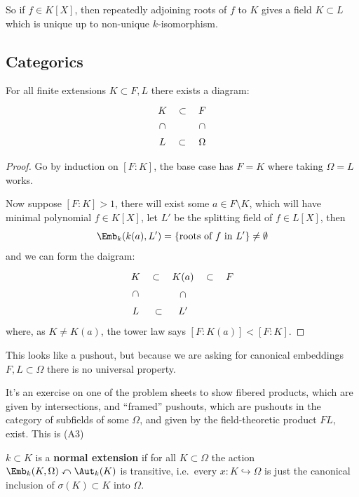 \documentclass{article}
\begin{document}
\begin{corollary}
    So if $f\in K[X]$, then repeatedly adjoining roots of $f$ to $K$ gives a field $K\subset L$ which is unique up to non-unique $k$-isomorphism.
\end{corollary}

\subsection{Categorics}

\begin{proposition}[A4]
    For all finite extensions $K\subset F,L$ there exists a diagram: \[\begin{tikzcd}
        K \arrow[r, phantom, "\subset"] \arrow[d, phantom, sloped, "\subset"]  & F \arrow[d, phantom, sloped, "\subset"] \\
        L \arrow[r, phantom, "\subset"] & \Omega
    \end{tikzcd}\]
\begin{proof}
    Go by induction on $[F:K]$, the base case has $F=K$ where taking $\Omega = L$ works. 
    
    Now suppose $[F:K]>1$, there will exist some $a\in F\setminus K$, which will have minimal polynomial $f\in K[X]$, let $L'$ be the splitting field of $f\in L[X]$, then \[\Emb_k(k(a),L') = \{\text{roots of $f$ in $L'$}\}\neq \emptyset\] and we can form the daigram:
    \[\begin{tikzcd}
        K \arrow[r, phantom, "\subset"] \arrow[d, phantom, sloped, "\subset"] & K(a) \arrow[r, phantom, "\subset"] \arrow[d, phantom, sloped, "\subset"] & F \\
        L \arrow[r, phantom, "\subset"] & L'
    \end{tikzcd}\]
    where, as $K\neq K(a)$, the tower law says $[F:K(a)] < [F:K]$.
\end{proof}
\end{proposition}

This looks like a pushout, but because we are asking for canonical embeddings $F,L\subset \Omega$ there is no universal property.

It's an exercise on one of the problem sheets to show fibered products, which are given by intersections, and ``framed'' pushouts, which are pushouts in the category of subfields of some $\Omega$, and given by the field-theoretic product $FL$, exist. This is (A3)

\begin{definition}
    $k\subset K$ is a \textbf{normal extension} if for all $K\subset\Omega$ the action $\Emb_k(K,\Omega)\curvearrowleft \Aut_k(K)$ is transitive, i.e.~every $x:K\hookrightarrow \Omega$ is just the canonical inclusion of $\sigma(K)\subset K$ into $\Omega$.
\end{definition}
\end{document}
